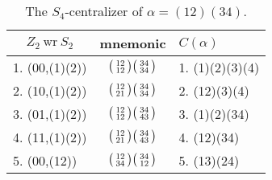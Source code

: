 \documentclass{surv-l}
\numberwithin{equation}{section}
\numberwithin{table}{section}
\numberwithin{figure}{section}
\theoremstyle{plain}
\theoremstyle{definition}
\begin{document}
\begin{table}
\caption{The $S_{4}$-centralizer of $\alpha=(12)(34)$.}\label{tab4.12.1}
{\begin{tabular}{|l|c|l|}
\hline
\multicolumn{1}{|c|}{$Z_{2}\  \mathrm{wr} \ S_{2}$}&   \multicolumn{1}{|c|}{mnemonic}& \multicolumn{1}{|l|}{$C(\alpha)$}   \\
\hline
1. (00,(1)(2)) &$\big(\kern0.5pt\begin{smallmatrix}12\\ 12\end{smallmatrix}\kern0.5pt\big) \big(\kern0.5pt\begin{smallmatrix}34\\ 34\end{smallmatrix}\kern0.5pt\big)$&1. (1)(2)(3)(4)\\[3pt]
2. (10,(1)(2))&$\big(\kern0.5pt\begin{smallmatrix}12\\ 21\end{smallmatrix}\kern0.5pt\big) \big(\kern0.5pt\begin{smallmatrix}34\\ 34\end{smallmatrix}\kern0.5pt\big)$&2. (12)(3)(4)\\[3pt]
3. (01,(1)(2))&$\big(\kern0.5pt\begin{smallmatrix}12\\ 12\end{smallmatrix}\kern0.5pt\big) \big(\kern0.5pt\begin{smallmatrix}34\\ 43\end{smallmatrix}\kern0.5pt\big)$&3. (1)(2)(34)\\[3pt]
4. (11,(1)(2))&$\big(\kern0.5pt\begin{smallmatrix}12\\ 21\end{smallmatrix}\kern0.5pt\big) \big(\kern0.5pt\begin{smallmatrix}34\\ 43\end{smallmatrix}\kern0.5pt\big)$&4. (12)(34)\\[3pt]
5. (00,(12))&$\big(\kern0.5pt\begin{smallmatrix}12\\ 34\end{smallmatrix}\kern0.5pt\big) \big(\kern0.5pt\begin{smallmatrix}34\\ 12\end{smallmatrix}\kern0.5pt\big)$&5. (13)(24)\\[3pt]

\end{tabular}}
\end{table}
\end{document}
